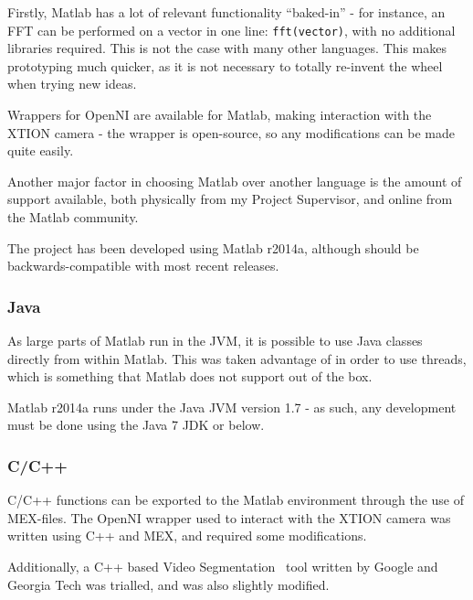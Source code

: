 Firstly, Matlab has a lot of relevant functionality ``baked-in'' - for instance, an \ac{FFT} can be performed on a vector in one line: \lstinline$fft(vector)$, with no additional libraries required. This is not the case with many other languages. This makes prototyping much quicker, as it is not necessary to totally re-invent the wheel when trying new ideas.

Wrappers for OpenNI are available for Matlab, making interaction with the XTION camera - the wrapper is open-source, so any modifications can be made quite easily.

Another major factor in choosing Matlab over another language is the amount of support available, both physically from my Project Supervisor, and online from the Matlab community. 

The project has been developed using Matlab r2014a, although should be backwards-compatible with most recent releases. 

\subsubsection{Java}
As large parts of Matlab run in the \ac{JVM}, it is possible to use Java classes directly from within Matlab. This was taken advantage of in order to use threads, which is something that Matlab does not support out of the box. 

Matlab r2014a runs under the Java JVM version 1.7 - as such, any development must be done using the Java 7 JDK or below. 

\subsubsection{C/C++}
C/C++ functions can be exported to the Matlab environment through the use of MEX-files. The OpenNI wrapper used to interact with the XTION camera was written using C++ and MEX, and required some modifications.

Additionally, a C++ based Video Segmentation~\cite{videosegment} tool written by Google and Georgia Tech was trialled, and was also slightly modified.
